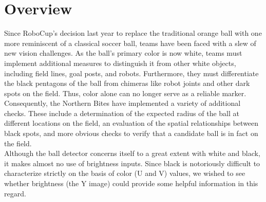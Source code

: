 \documentclass[11pt, twocolumn]{article}
\begin{document}
\section{Overview}
Since RoboCup's decision last year to replace the traditional orange ball with one more reminiscent of a classical soccer ball, teams have been faced with a slew of new vision challenges. As the ball's primary color is now white, teams must implement additional measures to distinguish it from other white objects, including field lines, goal posts, and robots. Furthermore, they must differentiate the black pentagons of the ball from chimeras like robot joints and other dark spots on the field. Thus, color alone can no longer serve as a reliable marker. Consequently, the Northern Bites have implemented a variety of additional checks. These include a determination of the expected radius of the ball at different locations on the field, an evaluation of the spatial relationships between black spots, and more obvious checks to verify that a candidate ball is in fact on the field. \\
\indent Although the ball detector concerns itself to a great extent with white and black, it makes almost no use of brightness inputs. Since black is notoriously difficult to characterize strictly on the basis of color (U and V) values, we wished to see whether brightness (the Y image) could provide some helpful information in this regard. 
\end{document}
